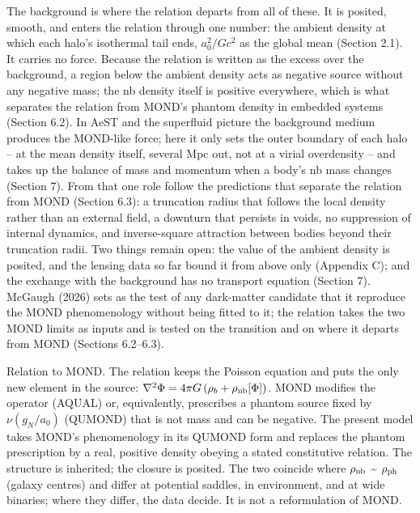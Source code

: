 \documentclass[
  10pt,
]{article}
\begin{document}
The background is where the relation departs from all of these. It is posited, smooth, and enters the relation through one number: the ambient density at which each halo's isothermal tail ends, $a_0^2/Gc^2$ as the global mean (Section 2.1). It carries no force. Because the relation is written as the excess over the background, a region below the ambient density acts as negative source without any negative mass; the nb density itself is positive everywhere, which is what separates the relation from MOND's phantom density in embedded systems (Section 6.2). In AeST and the superfluid picture the background medium produces the MOND-like force; here it only sets the outer boundary of each halo -- at the mean density itself, several Mpc out, not at a virial overdensity -- and takes up the balance of mass and momentum when a body's nb mass changes (Section 7). From that one role follow the predictions that separate the relation from MOND (Section 6.3): a truncation radius that follows the local density rather than an external field, a downturn that persists in voids, no suppression of internal dynamics, and inverse-square attraction between bodies beyond their truncation radii. Two things remain open: the value of the ambient density is posited, and the lensing data so far bound it from above only (Appendix C); and the exchange with the background has no transport equation (Section 7). McGaugh (2026) sets as the test of any dark-matter candidate that it reproduce the MOND phenomenology without being fitted to it; the relation takes the two MOND limits as inputs and is tested on the transition and on where it departs from MOND (Sections 6.2--6.3).

Relation to MOND. The relation keeps the Poisson equation and puts the only
new element in the source: $\nabla^2\Phi = 4\pi G\,(\rho_b+\rho_{\rm nb}[\Phi])$. MOND modifies the operator (AQUAL) or, equivalently,
prescribes a phantom source fixed by $\nu(g_N/a_0)$ (QUMOND) that is not
mass and can be negative. The present model takes MOND's phenomenology in
its QUMOND form and replaces the phantom prescription by a real,
positive density obeying a stated constitutive relation. The structure
is inherited; the closure is posited. The two coincide where $\rho_{\rm nb}$
\textasciitilde{} $\rho_{\rm ph}$ (galaxy centres) and differ at potential
saddles, in environment, and at wide binaries; where they differ, the
data decide. It is not a reformulation of MOND.
\end{document}
